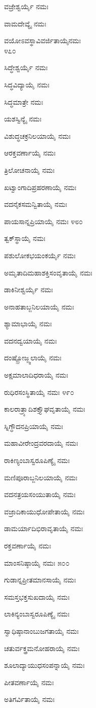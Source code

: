 ವಜ್ರೇಶ್ವರ್ಯೈ ನಮಃ

ವಾಮದೇವ್ಯೈ ನಮಃ

ವಯೋಽವಸ್ಥಾವಿವರ್ಜಿತಾಯೈನಮಃ\\\num{೪೭೦}

ಸಿದ್ಧೇಶ್ವರ್ಯೈ ನಮಃ

ಸಿದ್ಧವಿದ್ಯಾಯೈ ನಮಃ

ಸಿದ್ಧಮಾತ್ರೇ ನಮಃ

ಯಶಸ್ವಿನ್ಯೈ ನಮಃ

ವಿಶುದ್ಧಚಕ್ರನಿಲಯಾಯೈ ನಮಃ

ಆರಕ್ತವರ್ಣಾಯೈ ನಮಃ

ತ್ರಿಲೋಚನಾಯೈ ನಮಃ

ಖಟ್ವಾಂಗಾದಿಪ್ರಹರಣಾಯೈ ನಮಃ

ವದನೈಕಸಮನ್ವಿತಾಯೈ ನಮಃ

ಪಾಯಸಾನ್ನಪ್ರಿಯಾಯೈ ನಮಃ \num{೪೮೦}

ತ್ವಕ್​ಸ್ಥಾಯೈ ನಮಃ

ಪಶುಲೋಕಭಯಂಕರ್ಯೈ ನಮಃ

ಅಮೃತಾದಿಮಹಾಶಕ್ತಿಸಂವೃತಾಯೈ ನಮಃ

ಡಾಕಿನೀಶ್ವರ್ಯೈ ನಮಃ

ಅನಾಹತಾಬ್ಜನಿಲಯಾಯೈ ನಮಃ

ಶ್ಯಾಮಾಭಾಯೈ ನಮಃ

ವದನದ್ವಯಾಯೈ ನಮಃ

ದಂಷ್ಟ್ರೋಜ್ಜ್ವಲಾಯೈ ನಮಃ

ಅಕ್ಷಮಾಲಾದಿಧರಾಯೈ ನಮಃ

ರುಧಿರಸಂಸ್ಥಿತಾಯೈ ನಮಃ \num{೪೯೦}

ಕಾಲರಾತ್ರ್ಯಾದಿಶಕ್ತ್ಯೌಘವೃತಾಯೈ ನಮಃ

ಸ್ನಿಗ್ಧೌದನಪ್ರಿಯಾಯೈ ನಮಃ

ಮಹಾವೀರೇಂದ್ರವರದಾಯೈ ನಮಃ

ರಾಕಿಣ್ಯಂಬಾಸ್ವರೂಪಿಣ್ಯೈ ನಮಃ

ಮಣಿಪೂರಾಬ್ಜನಿಲಯಾಯೈ ನಮಃ

ವದನತ್ರಯಸಂಯುತಾಯೈ ನಮಃ

ವಜ್ರಾದಿಕಾಯುಧೋಪೇತಾಯೈ ನಮಃ

ಡಾಮರ್ಯಾದಿಭಿರಾವೃತಾಯೈ ನಮಃ

ರಕ್ತವರ್ಣಾಯೈ ನಮಃ

ಮಾಂಸನಿಷ್ಠಾಯೈ ನಮಃ \num{೫೦೦}

ಗುಡಾನ್ನಪ್ರೀತಮಾನಸಾಯೈ ನಮಃ

ಸಮಸ್ತಭಕ್ತಸುಖದಾಯೈ ನಮಃ

ಲಾಕಿನ್ಯಂಬಾಸ್ವರೂಪಿಣ್ಯೈ ನಮಃ

ಸ್ವಾಧಿಷ್ಠಾನಾಂಬುಜಗತಾಯೈ ನಮಃ

ಚತುರ್ವಕ್ತ್ರಮನೋಹರಾಯೈ ನಮಃ

ಶೂಲಾದ್ಯಾಯುಧಸಂಪನ್ನಾಯೈ ನಮಃ

ಪೀತವರ್ಣಾಯೈ ನಮಃ

ಅತಿಗರ್ವಿತಾಯೈ ನಮಃ

